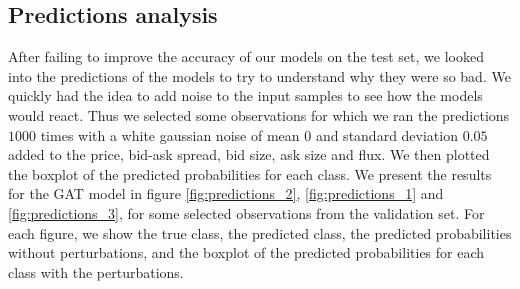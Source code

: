\documentclass[switch, 11pt]{article}
\begin{document}
\begin{multicols}{2}
    \subsection{Predictions analysis}

    After failing to improve the accuracy of our models on the test set, we looked into the predictions of the models to try to understand why they were so bad. We quickly had the idea to add noise to the input samples to see how the models would react. Thus we selected some observations for which we ran the predictions $1000$ times with a white gaussian noise of mean $0$ and standard deviation $0.05$ added to the price, bid-ask spread, bid size, ask size and flux. We then plotted the boxplot of the predicted probabilities for each class. We present the results for the GAT model in figure \ref{fig:predictions_2}, \ref{fig:predictions_1} and \ref{fig:predictions_3}, for some selected observations from the validation set. For each figure, we show the true class, the predicted class, the predicted probabilities without perturbations, and the boxplot of the predicted probabilities for each class with the perturbations.


\end{multicols}
\end{document}
